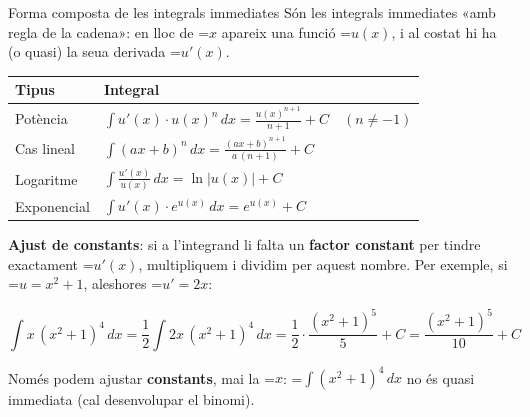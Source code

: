 \documentclass[11pt,a4paper]{article}
\newcommand{\fmm}[1]{\setbox0=\hbox{$#1$}\ifdim\wd0>\linewidth\[#1\]\else\mbox{\box0}\fi}
\newcommand{\fmuline}[1]{\textbf{\color{fmaccent}#1}}
\begin{document}
  
\begin{fmdef}{Forma composta de les integrals immediates}
Són les integrals immediates «amb regla de la cadena»: en lloc de \fmm{x} apareix una funció \fmm{u(x)}, i al costat hi ha (o quasi) la seua derivada \fmm{u'(x)}.

      
\begin{center}\renewcommand{\arraystretch}{2.3}\small\begin{tabularx}{\linewidth}{>{\raggedright\arraybackslash}p{3.2cm}>{\centering\arraybackslash}X}\toprule
\textbf{Tipus} & \textbf{Integral}\\\midrule
Potència & $\displaystyle\int u'(x)\cdot u(x)^n\,dx=\frac{u(x)^{n+1}}{n+1}+C\quad(n\neq-1)$\\[3pt]
Cas lineal & $\displaystyle\int(ax+b)^n\,dx=\frac{(ax+b)^{n+1}}{a\,(n+1)}+C$\\[3pt]
Logaritme & $\displaystyle\int\frac{u'(x)}{u(x)}\,dx=\ln|u(x)|+C$\\[3pt]
Exponencial & $\displaystyle\int u'(x)\cdot e^{u(x)}\,dx=e^{u(x)}+C$\\[3pt]
\bottomrule\end{tabularx}\end{center}

      

\fmuline{Ajust de constants}: si a l'integrand li falta un \textbf{factor constant} per tindre exactament \fmm{u'(x)}, multipliquem i dividim per aquest nombre. Per exemple, si \fmm{u=x^2+1}, aleshores \fmm{u'=2x}:

      
\[\int x\,(x^2+1)^4\,dx=\frac12\int 2x\,(x^2+1)^4\,dx=\frac12\cdot\frac{(x^2+1)^5}{5}+C=\frac{(x^2+1)^5}{10}+C\]

      
\begin{fmnote}Només podem ajustar \textbf{constants}, mai la \fmm{x}: \fmm{\int(x^2+1)^4\,dx} no és quasi immediata (cal desenvolupar el binomi).\end{fmnote}
\end{fmdef}
\end{document}
